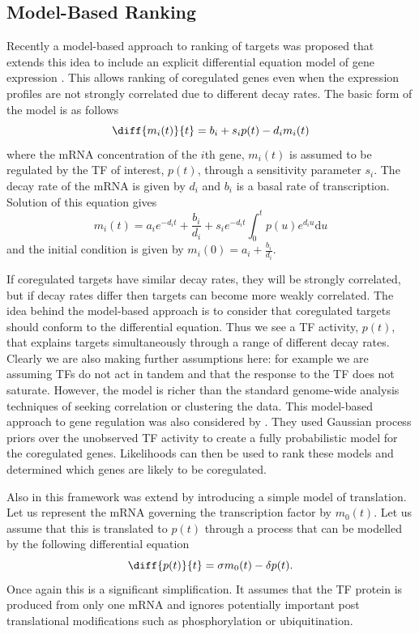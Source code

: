 \documentclass{article}
\begin{document}
\subsection{Model-Based Ranking}

Recently a  model-based  approach to ranking  of targets  was proposed
that extends  this idea to  include an explicit  differential equation
model  of   gene  expression  \cite{Barenco:ranked06}. This  allows
ranking of coregulated genes even when the expression profiles are not
strongly  correlated due to different decay  rates. The  basic form  of the
model is as follows
\begin{equation}
  \diff{m_i(t)}{t} = b_i + s_i p(t) - d_i m_i(t)
\end{equation}
where the mRNA concentration of the $i$th gene, $m_i(t)$ is assumed to
be  regulated by  the TF  of interest,  $p(t)$, through  a sensitivity
parameter $s_i$.  The decay  rate of  the mRNA is  given by  $d_i$ and
$b_i$  is a  basal rate  of transcription.  Solution of  this equation
gives
\begin{equation}
  m_i(t) = a_i e^{-d_it} + \frac{b_i}{d_i} + s_i
  e^{-d_it}\int_0^tp(u)e^{d_i u}\mathrm{d} u \label{eq:linearOperator}
\end{equation}
and the initial condition is given by $m_i(0)=a_i + \frac{b_i}{d_i}$. 

If coregulated targets have similar decay rates, they will be strongly
correlated, but  if decay  rates differ then  targets can  become more
weakly correlated.  The  idea behind the model-based  approach is to
consider that  coregulated targets should conform  to the differential
equation. Thus  we see  a TF activity,  $p(t)$, that  explains targets
simultaneously through  a range of different decay  rates.  Clearly we
are also making further assumptions  here: for example we are assuming
TFs  do not act  in tandem  and  that the  response to  the TF  does not
saturate. However,  the model is richer than  the standard genome-wide
analysis   techniques  of  seeking   correlation  or   clustering  the
data. This model-based approach to gene regulation was also considered
by  \cite{Gao:latent08}. They  used Gaussian  process priors  over the
unobserved TF activity  to create a fully probabilistic  model for the
coregulated genes.  Likelihoods can then  be used to rank these models
and determined which genes are likely to be coregulated.

Also in \cite{Gao:latent08} this framework was extend by introducing a
simple model  of translation.  Let us represent the  mRNA governing the
transcription factor by $m_0(t)$. Let us assume that this is translated
to  $p(t)$ through a  process that  can be  modelled by  the following
differential equation
\begin{equation}
  \diff{p(t)}{t} = \sigma m_0(t) - \delta p(t).
\end{equation}
Once again this  is a significant simplification. It  assumes that the
TF  protein is  produced from  only one  mRNA and  ignores potentially
important post translational  modifications such as phosphorylation or
ubiquitination.
\end{document}
